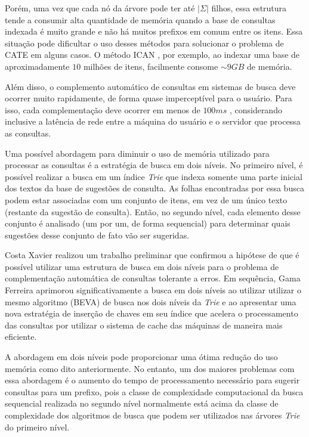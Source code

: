 Porém, uma vez que cada nó da árvore pode ter até $|\Sigma|$ filhos, essa estrutura tende a consumir alta quantidade de memória quando a base de consultas indexada é muito grande e não há muitos prefixos em comum entre os itens. Essa situação pode dificultar o uso desses métodos para solucionar o problema de CATE em alguns casos. O método ICAN \citep{ji2009efficient}, por exemplo, ao indexar uma base de aproximadamente $10$ milhões de itens, facilmente consome $\sim9GB$ de memória. 

Além disso, o complemento automático de consultas em sistemas de busca deve ocorrer muito rapidamente, de forma quase imperceptível para o usuário. Para isso, cada complementação deve ocorrer em menos de $100ms$ \citep{ji2009efficient}, considerando inclusive a latência de rede entre a máquina do usuário e o servidor que processa as consultas.

Uma possível abordagem para diminuir o uso de memória utilizado para processar as consultas é a estratégia de busca em dois níveis. No primeiro nível, é possível realizar a busca em um índice \textit{Trie} que indexa somente uma parte inicial dos textos da base de sugestões de consulta. As folhas encontradas por essa busca podem estar associadas com um conjunto de itens, em vez de um único texto (restante da sugestão de consulta). Então, no segundo nível, cada elemento desse conjunto é analisado (um por um, de forma sequencial) para determinar quais sugestões desse conjunto de fato vão ser sugeridas. 

Costa Xavier \citep{xavier2019} realizou um trabalho preliminar que confirmou a hipótese de que é possível utilizar uma estrutura de busca em dois níveis para o problema de complementação automática de consultas tolerante a erros. Em sequência, Gama Ferreira \citep{berg2020} aprimorou significativamente a busca em dois níveis ao utilizar utilizar o mesmo algoritmo (BEVA) de busca nos dois níveis da \textit{Trie} e ao apresentar uma nova estratégia de inserção de chaves em seu índice que acelera o processamento das consultas por utilizar o sistema de cache das máquinas de maneira mais eficiente. %

A abordagem em dois níveis pode proporcionar uma ótima redução do uso memória como dito anteriormente. No entanto, um dos maiores problemas com essa abordagem é o aumento do tempo de processamento necessário para sugerir consultas para um prefixo, pois a classe de complexidade computacional da busca sequencial realizada no segundo nível normalmente está acima da classe de complexidade dos algoritmos de busca que podem ser utilizados nas árvores \textit{Trie} do primeiro nível.

